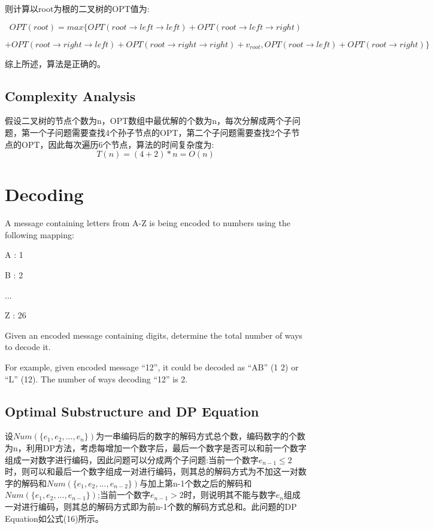 \documentclass{article}
\begin{document}
则计算以root为根的二叉树的OPT值为:

\begin{equation}
OPT(root)=max\{OPT(root\rightarrow left\rightarrow left) +OPT(root\rightarrow left \rightarrow right)
\end{equation}

\begin{center}
$+OPT(root\rightarrow right\rightarrow left)+OPT(root\rightarrow right\rightarrow right)+v_{root}, OPT(root\rightarrow left)+OPT(root\rightarrow right)\}$
\end{center} 

综上所述，算法是正确的。

\subsection{Complexity Analysis}

假设二叉树的节点个数为n，OPT数组中最优解的个数为n，每次分解成两个子问题，第一个子问题需要查找4个孙子节点的OPT，第二个子问题需要查找2个子节点的OPT，因此每次遍历6个节点，算法的时间复杂度为:
\begin{equation}
T(n)=(4+2)*n=O(n)
\end{equation}

\newpage
\section{Decoding}

A message containing letters from A-Z is being encoded to numbers using the following mapping:

\begin{center}
A : 1

B : 2 

... 

Z : 26
\end{center}

Given an encoded message containing digits, determine the total number of ways to decode it.

For example, given encoded message “12”, it could be decoded as “AB” (1 2) or “L” (12). The number of ways decoding “12” is 2.

\subsection{Optimal Substructure and DP Equation}

设$Num(\{e_1,e_2,...,e_n\})$为一串编码后的数字的解码方式总个数，编码数字的个数为n，利用DP方法，考虑每增加一个数字后，最后一个数字是否可以和前一个数字组成一对数字进行编码，因此问题可以分成两个子问题:当前一个数字$e_{n-1}\leq2$时，则可以和最后一个数字组成一对进行编码，则其总的解码方式为不加这一对数字的解码和$Num(\{e_1,e_2,...,e_{n-2}\})$与加上第n-1个数之后的解码和$Num(\{e_1,e_2,...,e_{n-1}\})$;当前一个数字$e_{n-1}>2$时，则说明其不能与数字$e_n$组成一对进行编码，则其总的解码方式即为前n-1个数的解码方式总和。此问题的DP Equation如公式(16)所示。
\end{document}
